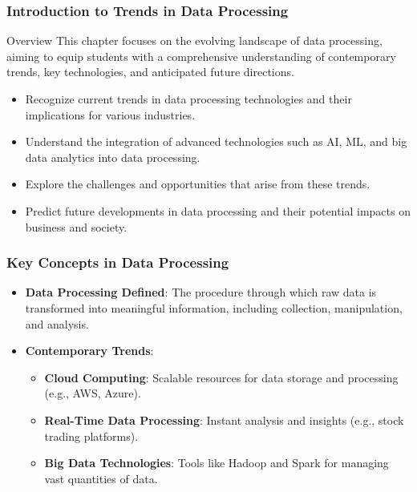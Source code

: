 \documentclass[aspectratio=169]{beamer}
\begin{document}
\frame{\titlepage}

\begin{frame}[fragile]
    \frametitle{Introduction to Trends in Data Processing}
    \begin{block}{Overview}
        This chapter focuses on the evolving landscape of data processing, aiming to equip students with a comprehensive understanding of contemporary trends, key technologies, and anticipated future directions.
    \end{block}
    \begin{itemize}
        \item Recognize current trends in data processing technologies and their implications for various industries.
        \item Understand the integration of advanced technologies such as AI, ML, and big data analytics into data processing.
        \item Explore the challenges and opportunities that arise from these trends.
        \item Predict future developments in data processing and their potential impacts on business and society.
    \end{itemize}
\end{frame}

\begin{frame}[fragile]
    \frametitle{Key Concepts in Data Processing}
    \begin{itemize}
        \item \textbf{Data Processing Defined}: The procedure through which raw data is transformed into meaningful information, including collection, manipulation, and analysis.
        \item \textbf{Contemporary Trends}:
            \begin{itemize}
                \item \textbf{Cloud Computing}: Scalable resources for data storage and processing (e.g., AWS, Azure).
                \item \textbf{Real-Time Data Processing}: Instant analysis and insights (e.g., stock trading platforms).
                \item \textbf{Big Data Technologies}: Tools like Hadoop and Spark for managing vast quantities of data.
            \end{itemize}
    \end{itemize}
\end{frame}
\end{document}

